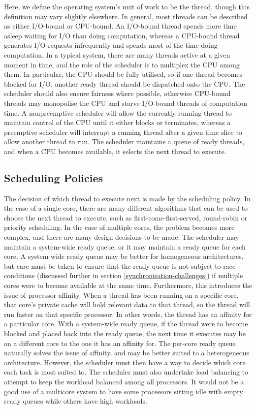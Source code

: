 \documentclass[bsc,frontabs,singlespacing,parskip,deptreport]{infthesis}
\begin{document}
Here, we define the operating system's unit of work to be the thread, though this definition may vary slightly elsewhere. In general, most threads can be described as either I/O-bound or CPU-bound. An I/O-bound thread spends more time asleep waiting for I/O than doing computation, whereas a CPU-bound thread generates I/O requests infrequently and spends most of the time doing computation. In a typical system, there are many threads active at a given moment in time, and the role of the scheduler is to multiplex the CPU among them. In particular, the CPU should be fully utilised, so if one thread becomes blocked for I/O, another ready thread should be dispatched onto the CPU. The scheduler should also ensure fairness where possible, otherwise CPU-bound threads may monopolise the CPU and starve I/O-bound threads of computation time. A nonpreemptive scheduler will allow the currently running thread to maintain control of the CPU until it either blocks or terminates, whereas a preemptive scheduler will interrupt a running thread after a given time slice to allow another thread to run. The scheduler maintains a queue of ready threads, and when a CPU becomes available, it selects the next thread to execute.

\subsection{Scheduling Policies}
\label{scheduling-challenges}
The decision of which thread to execute next is made by the scheduling policy. In the case of a single core, there are many different algorithms that can be used to choose the next thread to execute, such as first-come-first-served, round-robin or priority scheduling. In the case of multiple cores, the problem becomes more complex, and there are many design decisions to be made. The scheduler may maintain a system-wide ready queue, or it may maintain a ready queue for each core. A system-wide ready queue may be better for homogeneous architectures, but care must be taken to ensure that the ready queue is not subject to race conditions (discussed further in section \ref{synchronisation-challenges}) if multiple cores were to become available at the same time. Furthermore, this introduces the issue of processor affinity. When a thread has been running on a specific core, that core’s private cache will hold relevant data to that thread, so the thread will run faster on that specific processor. In other words, the thread has an affinity for a particular core. With a system-wide ready queue, if the thread were to become blocked and placed back into the ready queue, the next time it executes may be on a different core to the one it has an affinity for. The per-core ready queue naturally solves the issue of affinity, and may be better suited to a heterogeneous architecture. However, the scheduler must then have a way to decide which core each task is most suited to. The scheduler must also undertake load balancing to attempt to keep the workload balanced among all processors. It would not be a good use of a multicore system to have some processors sitting idle with empty ready queues while others have high workloads. 
\end{document}
